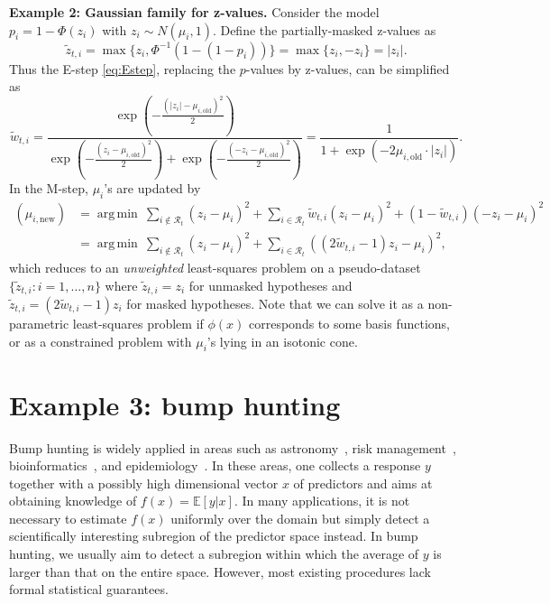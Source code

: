 \documentclass{biometrika}
\newcommand{\cR}{\mathcal{R}}
\newcommand{\exps}[1]{\exp\lb#1\rb}
\newcommand{\lb}{\left(}
\newcommand{\rb}{\right)}
\newcommand{\td}{\tilde}
\newcommand{\E}{\mathbb{E}}
\newcommand{\1}{\mathbf{1}}
\DeclareMathOperator*{\argmin}{arg\,min}
\begin{document}
\vspace{0.3em}
\noindent \textbf{Example 2: Gaussian family for z-values.} Consider the model $p_{i} = 1 - \Phi(z_{i})$ with $z_{i}\sim N(\mu_{i}, 1)$. Define the partially-masked z-values as
\[\td{z}_{t, i} = \max\{z_{i}, \Phi^{-1}(1 - (1 - p_{i}))\} = \max\{z_{i}, -z_{i}\} = |z_{i}|.\]
Thus the E-step \eqref{eq:Estep}, replacing the $p$-values by z-values, can be simplified as
\[\td{w}_{t, i} = \frac{\exps{-\frac{(|z_i| - \mu_{i,\mathrm{old}})^2}{2}}}{\exps{-\frac{(z_i - \mu_{i,\mathrm{old}})^2}{2}} + \exps{-\frac{(-z_i - \mu_{i,\mathrm{old}})^2}{2}}} = \frac{1}{1 + \exps{-2\mu_{i, \mathrm{old}}\cdot |z_i|}}.\]
In the M-step, $\mu_{i}$'s are updated by
\begin{align}
(\mu_{i, \mathrm{new}}) &= \argmin ~\sum_{i\not\in \cR_{t}}(z_{i} - \mu_{i})^2 + \sum_{i\in \cR_{t}}\td{w}_{t, i}(z_{i} - \mu_{i})^{2} + (1 - \td{w}_{t, i})(-z_{i} - \mu_{i})^2\nonumber\\
& = \argmin ~ \sum_{i\not\in \cR_{t}}(z_{i} - \mu_{i})^2 + \sum_{i\in \cR_{t}}((2\td{w}_{t, i} - 1)z_{i} - \mu_{i})^{2},\nonumber
\end{align}
which reduces to an \emph{unweighted} least-squares problem on a pseudo-dataset $\{\td{z}_{t, i}: i = 1, \ldots, n\}$ where $\td{z}_{t, i} = z_{i}$ for unmasked hypotheses and $\td{z}_{t, i} = (2\td{w}_{t, i} - 1)z_{i}$ for masked hypotheses. Note that we can solve it as a non-parametric least-squares problem if $\phi(x)$ corresponds to some basis functions, or as a constrained problem with $\mu_{i}$'s lying in an isotonic cone.

\section{Example 3: bump hunting}\label{sec:bump}

Bump hunting is widely applied in areas such as astronomy~\citep{good80}, risk management~\citep{becker01}, bioinformatics~\citep{jiang06}, and epidemiology~\citep{jaffe12}. In these areas, one collects a response $y$ together with a possibly high dimensional vector $x$ of predictors and aims at obtaining knowledge of $f(x) = \E [y | x]$. In many applications, it is not necessary to estimate $f(x)$ uniformly over the domain but simply detect a scientifically interesting subregion of the predictor space instead. In bump hunting, we usually aim to detect a subregion  within which the average of $y$ is larger than that on the entire space. However, most existing procedures lack formal statistical guarantees.
\end{document}
